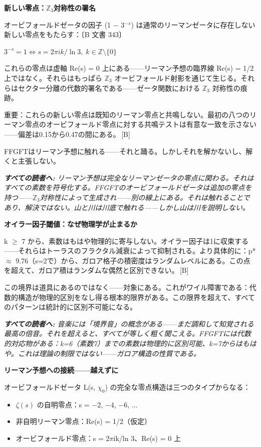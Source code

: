 \documentclass[11pt,openany]{book}
\newcommand{\status}[1]{\penalty10000\,{\tiny\textcolor{gray!70}{[#1]}}}
\newenvironment{laierspur}{%
  \par\vspace{4pt}%
  \noindent\small\itshape\color{blue!60!black}%
  \textbf{すべての読者へ:}\enspace\ignorespaces}{%
  \par\vspace{4pt}\normalsize\normalfont\normalcolor}
\begin{document}
\textbf{新しい零点：$\mathbb{Z}_3$対称性の署名}

オービフォールドゼータの因子 (1 $-$ 3$^{-s}$) は通常のリーマンゼータに存在しない新しい零点をもたらす：〔B 文書 343〕

$3^{-s} = 1 \Longleftrightarrow s = 2\pi ik/\ln 3,\; k \in \mathbb{Z}\setminus\{0\}$

これらの零点は虚軸 Re(s) = 0 上にある——リーマン予想の臨界線 Re(s) = 1/2 上ではなく。それらはもっぱら $\mathbb{Z}_3$ オービフォールド射影を通じて生じる。それらはセクター分離の代数的署名である——ゼータ関数における $\mathbb{Z}_3$ 対称性の痕跡。

重要：これらの新しい零点は既知のリーマン零点と共鳴しない。最初の八つのリーマン零点のオービフォールド零点に対する共鳴テストは有意な一致を示さない——偏差は0.15から0.47の間にある。\status{B}

FFGFTはリーマン予想に触れる——それと踊る。しかしそれを解かないし、解くと主張しない。

\begin{laierspur}
リーマン予想は完全なリーマンゼータの零点に関わる。それはすべての素数を符号化する。FFGFTのオービフォールドゼータは追加の零点を持つ——$\mathbb{Z}_3$対称性によって生成され——別の線上にある。それは触れることであり、解決ではない。山と川は川底で触れる——しかし山は川を説明しない。
\end{laierspur}

\textbf{オイラー因子閾値：なぜ物理学が止まるか}

k $\geq$ 7 から、素数はもはや物理的に寄与しない。オイラー因子は1に収束する——それらはトーラスのフラクタル減衰によって抑制される。より具体的に：p* $\approx$ 9.76（s=2で）から、ガロア格子の積密度はランダムレベルにある。この点を超えて、ガロア積はランダムな偶然と区別できない。\status{B}

この境界は道具にあるのではなく——対象にある。これがワイル障害である：代数的構造が物理的区別をなし得る根本的限界がある。この限界を超えて、すべてのパターンは統計的に区別不可能になる。

\begin{laierspur}
音楽には「境界音」の概念がある——まだ調和して知覚される最高の倍音。それを超えると、すべてが等しく粗く聞こえる。FFGFTには代数的対応物がある：k=6（素数7）までの素数は物理的に区別可能、k=7からはもはや。これは理論の制限ではない——ガロア構造の性質である。
\end{laierspur}

\textbf{リーマン予想への接続——越えずに}

オービフォールドゼータ L(s, $\chi_0$) の完全な零点構造は三つのタイプからなる：
\begin{itemize}
\item $\zeta(s)$ の自明零点：s = $-2$, $-4$, $-6$, ...
\item 非自明リーマン零点：Re(s) = 1/2（仮定）
\item オービフォールド零点：s = 2$\pi$ik/ln 3、Re(s) = 0 上
\end{itemize}
\end{document}
